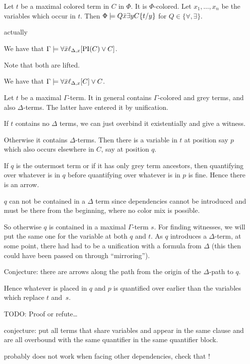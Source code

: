 \documentclass[,%
	paper=a4,%
	DIV14, 
	liststotoc,
	bibtotoc,
	draft=false,%
	numbers=noendperiod
]{scrartcl}
\begin{document}
\begin{lemma}

	Let $t$ be a maximal colored term in $C$ in $\Phi$. It is $\Phi$-colored.
	Let $x_1, \ldots, x_n$ be the variables which occur in $t$.
	Then $\Phi \models Q \bar x \exists y C\{t/y\}$ for $Q \in \{\forall, \exists\}$.

\end{lemma}

\clearpage

{\huge

	actually

	We have that $\Gamma \models \forall \bar x \ell_{\Delta,x}[ \operatorname{PI}(C) \lor C]$.

	Note that both are lifted.
	\medskip


}
We have that $\Gamma \models \forall \bar x \ell_{\Delta,x}[C] \lor C$.
\bigskip

Let $t$ be a maximal $\Gamma$-term.
It in general contains $\Gamma$-colored and grey terms, and also $\Delta$-terms.
The latter have entered it by unification.

If $t$ contains no $\Delta$ terms, we can just overbind it existentially and give a witness.

Otherwise it contains $\Delta$-terms.
Then there is a variable in $t$ at position say $p$ which also occurs elsewhere in $C$, say at position $q$.

If $q$ is the outermost term or if it has only grey term ancestors, then quantifying over whatever is in $q$ before quantifying over whatever is in $p$ is fine. Hence there is an arrow.

$q$ can not be contained in a $\Delta$ term since dependencies cannot be introduced and must be there from the beginning, where no color mix is possible.

So otherwise $q$ is contained in a maximal $\Gamma$-term $s$. For finding witnesses, we will put the same one for the variable at both $q$ and $t$.
As $q$ introduces a $\Delta$-term, at some point, there had had to be a unification with a formula from $\Delta$ (this then could have been passed on through ``mirroring'').

Conjecture: there are arrows along the path from the origin of the $\Delta$-path to $q$.

Hence whatever is placed in $q$ and $p$ is quantified over earlier than the variables which replace $t$ and~$s$.

TODO: Proof or refute\dots

{

	conjecture: put all terms that share variables and appear in the same clause and are all overbound with the same quantifier in the same quantifier block.

	probably does not work when facing other dependencies, check that !

}
\end{document}
